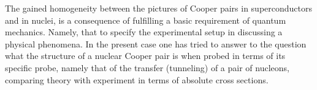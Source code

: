  The gained homogeneity  between the pictures of Cooper pairs in superconductors and in nuclei, is a consequence of fulfilling a basic requirement of quantum mechanics. Namely, that to specify the experimental setup in discussing a physical phenomena. In the present case one has tried to answer to the question what the structure of a nuclear Cooper pair is when probed in terms of its specific probe, namely that of  the transfer (tunneling) of a pair of nucleons, comparing theory with experiment in terms of absolute cross sections. 












\begin{subappendices}

\end{subappendices}

